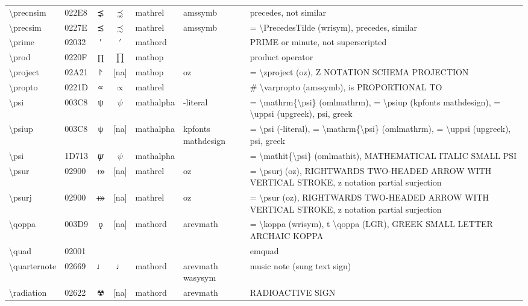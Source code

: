 \documentclass[a4paper,landscape]{article}
\begin{document}
\begin{longtable}{llcclll}
\textbackslash{}precnsim & 022E8 & ⋨ & $\precnsim$ & mathrel & amssymb & precedes, not similar \\
\textbackslash{}precsim & 0227E & ≾ & $\precsim$ & mathrel & amssymb & = \textbackslash{}PrecedesTilde (wrisym), precedes, similar \\
\textbackslash{}prime & 02032 & ′ & $\prime$ & mathord &  & PRIME or minute, not superscripted \\
\textbackslash{}prod & 0220F & ∏ & $\prod$ & mathop &  & product operator \\
\textbackslash{}project & 02A21 & ⨡ & [na] & mathop & oz & = \textbackslash{}zproject (oz),  Z NOTATION SCHEMA PROJECTION \\
\textbackslash{}propto & 0221D & ∝ & $\propto$ & mathrel &  & \# \textbackslash{}varpropto (amssymb), is PROPORTIONAL TO \\
\textbackslash{}psi & 003C8 & ψ & $\psi$ & mathalpha & -literal & = \textbackslash{}mathrm\{\textbackslash{}psi\} (omlmathrm), = \textbackslash{}psiup (kpfonts mathdesign), = \textbackslash{}uppsi (upgreek), psi, greek \\
\textbackslash{}psiup & 003C8 & ψ & [na] & mathalpha & kpfonts mathdesign & = \textbackslash{}psi (-literal), = \textbackslash{}mathrm\{\textbackslash{}psi\} (omlmathrm),  = \textbackslash{}uppsi (upgreek),  psi,  greek \\
\textbackslash{}psi & 1D713 & 𝜓 & $\psi$ & mathalpha &  & = \textbackslash{}mathit\{\textbackslash{}psi\} (omlmathit), MATHEMATICAL ITALIC SMALL PSI \\
\textbackslash{}psur & 02900 & ⤀ & [na] & mathrel & oz & = \textbackslash{}psurj (oz), RIGHTWARDS TWO-HEADED ARROW WITH VERTICAL STROKE, z notation partial surjection \\
\textbackslash{}psurj & 02900 & ⤀ & [na] & mathrel & oz & = \textbackslash{}psur (oz),  RIGHTWARDS TWO-HEADED ARROW WITH VERTICAL STROKE,  z notation partial surjection \\
\textbackslash{}qoppa & 003D9 & ϙ & [na] & mathord & arevmath & = \textbackslash{}koppa (wrisym), t \textbackslash{}qoppa (LGR), GREEK SMALL LETTER ARCHAIC KOPPA \\
\textbackslash{}quad & 02001 &   & $\quad$ &  &  & emquad \\
\textbackslash{}quarternote & 02669 & ♩ & $\quarternote$ & mathord & arevmath wasysym & music note (sung text sign) \\
\textbackslash{}radiation & 02622 & ☢ & [na] & mathord & arevmath & RADIOACTIVE SIGN \\

\end{longtable}
\end{document}
